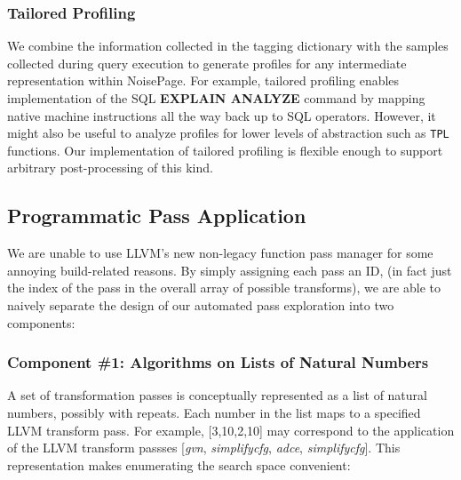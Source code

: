 \documentclass{vldb}
\newcommand{\tpl}{\texttt{TPL}\xspace}
\newcommand{\dbCode}[1]{{\sffamily\small \textbf{#1}}\xspace}
\begin{document}
\subsubsection{Tailored Profiling}

We combine the information collected in the tagging dictionary with the samples collected during query execution to generate profiles for any intermediate representation within NoisePage. For example, tailored profiling enables implementation of the SQL \dbCode{EXPLAIN ANALYZE} command by mapping native machine instructions all the way back up to SQL operators. However, it might also be useful to analyze profiles for lower levels of abstraction such as \tpl functions. Our implementation of tailored profiling is flexible enough to support arbitrary post-processing of this kind.

\subsection{Programmatic Pass Application}

We are unable to use LLVM's new non-legacy function pass manager for some annoying build-related reasons. By simply assigning each pass an ID, (in fact just the index of the pass in the overall array of possible transforms), we are able to naively separate the design of our automated pass exploration into two components:

\subsubsection{Component \#1: Algorithms on Lists of Natural Numbers}

A set of transformation passes is conceptually represented as a list of natural numbers, possibly with repeats. Each number in the list maps to a specified LLVM transform pass. For example, [3,10,2,10] may correspond to the application of the LLVM transform passses [\textit{gvn}, \textit{simplifycfg}, \textit{adce}, \textit{simplifycfg}]. This representation makes enumerating the search space convenient:
\end{document}
